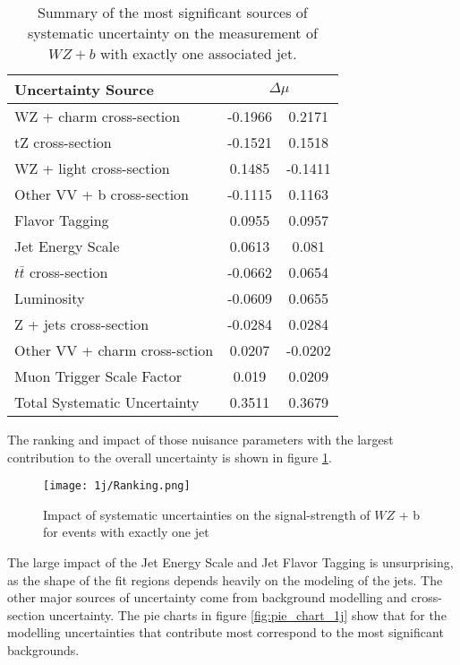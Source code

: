 \begin{table}[H]
    \centering
    \begin{tabular}{l|cc}
        \hline\hline
        Uncertainty Source & \multicolumn{2}{c}{$\Delta \mu$ }  \\
        \hline
        WZ + charm cross-section & -0.1966 & 0.2171 \\
        tZ cross-section & -0.1521 & 0.1518 \\
        WZ + light cross-section & 0.1485 & -0.1411 \\
        Other VV + b cross-section & -0.1115 & 0.1163 \\
        Flavor Tagging & 0.0955 & 0.0957 \\
        Jet Energy Scale & 0.0613 & 0.081 \\
        $t\bar{t}$ cross-section & -0.0662 & 0.0654 \\
        Luminosity & -0.0609 & 0.0655 \\
        Z + jets cross-section & -0.0284 & 0.0284 \\
        Other VV + charm cross-sction & 0.0207 & -0.0202 \\
        Muon Trigger Scale Factor & 0.019 & 0.0209 \\
        \hline
        Total Systematic Uncertainty & 0.3511 & 0.3679 \\
        \hline\hline
    \end{tabular}
    \caption{Summary of the most significant sources of systematic uncertainty on the measurement of $WZ+b$ with exactly one associated jet.}
    \label{tab:systematics_1j}
\end{table}

The ranking and impact of those nuisance parameters with the largest contribution to the overall uncertainty is shown in figure \ref{fig:ranking_1j}.

\begin{figure}[H]
    \centering
    \texttt{[image: 1j/Ranking.png]}
    \caption{Impact of systematic uncertainties on the signal-strength of $WZ$ + b for events with exactly one jet}
    \label{fig:ranking_1j}
\end{figure}

The large impact of the Jet Energy Scale and Jet Flavor Tagging is unsurprising, as the shape of the fit regions depends heavily on the modeling of the jets. The other major sources of uncertainty come from background modelling and cross-section uncertainty. The pie charts in figure \ref{fig:pie_chart_1j} show that for the modelling uncertainties that contribute most correspond to the most significant backgrounds. %

